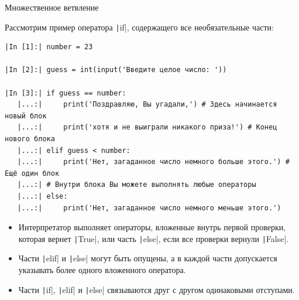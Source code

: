\documentclass[aspectratio=169]{beamer}	%
\begin{document}
\begin{frame}[fragile]{Множественное ветвление}
\scriptsize

Рассмотрим пример оператора \texttt|if|, содержащего все необязательные части:

\begin{verbatim}
|In [1]:| number = 23

|In [2]:| guess = int(input('Введите целое число: '))

|In [3]:| if guess == number:
   |...:|     print('Поздравляю, Вы угадали,') # Здесь начинается новый блок
   |...:|     print('хотя и не выиграли никакого приза!') # Конец нового блока
   |...:| elif guess < number:
   |...:|     print('Нет, загаданное число немного больше этого.') # Ещё один блок 
   |...:| # Внутри блока Вы можете выполнять любые операторы
   |...:| else:
   |...:|     print('Нет, загаданное число немного меньше этого.')
\end{verbatim}

\begin{itemize}
	\item  Интерпретатор выполняет операторы, вложенные внутрь первой проверки, которая вернет \texttt|True|, или часть \texttt|else|, если все проверки вернули \texttt|False|. 
	
	\item Части \texttt|elif| и \texttt|else| могут быть опущены, а в каждой части допускается указывать более одного вложенного оператора. 
	
	\item Части \texttt|if|, \texttt|elif| и \texttt|else| связываются друг с другом одинаковыми отступами.
\end{itemize}

\end{frame}
\end{document}
